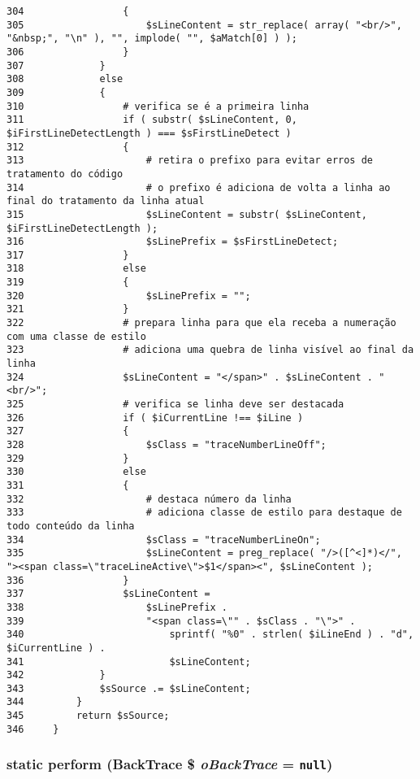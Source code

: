 \begin{Code}
\begin{verbatim}
304                 {
305                     $sLineContent = str_replace( array( "<br/>", "&nbsp;", "\n" ), "", implode( "", $aMatch[0] ) );
306                 }
307             }
308             else
309             {
310                 # verifica se é a primeira linha
311                 if ( substr( $sLineContent, 0, $iFirstLineDetectLength ) === $sFirstLineDetect )
312                 {
313                     # retira o prefixo para evitar erros de tratamento do código
314                     # o prefixo é adiciona de volta a linha ao final do tratamento da linha atual
315                     $sLineContent = substr( $sLineContent, $iFirstLineDetectLength );
316                     $sLinePrefix = $sFirstLineDetect;
317                 }
318                 else
319                 {
320                     $sLinePrefix = "";
321                 }
322                 # prepara linha para que ela receba a numeração com uma classe de estilo
323                 # adiciona uma quebra de linha visível ao final da linha
324                 $sLineContent = "</span>" . $sLineContent . "<br/>";
325                 # verifica se linha deve ser destacada
326                 if ( $iCurrentLine !== $iLine )
327                 {
328                     $sClass = "traceNumberLineOff";
329                 }
330                 else
331                 {
332                     # destaca número da linha
333                     # adiciona classe de estilo para destaque de todo conteúdo da linha
334                     $sClass = "traceNumberLineOn";
335                     $sLineContent = preg_replace( "/>([^<]*)</", "><span class=\"traceLineActive\">$1</span><", $sLineContent );
336                 }
337                 $sLineContent =
338                     $sLinePrefix .
339                     "<span class=\"" . $sClass . "\">" .
340                         sprintf( "%0" . strlen( $iLineEnd ) . "d", $iCurrentLine ) .
341                         $sLineContent;
342             }
343             $sSource .= $sLineContent;
344         }
345         return $sSource;
346     }
\end{verbatim}
\end{Code}


\hypertarget{class_back_trace_explain_4e3e5944ef133f107e9ebc98f1abde0a}{
\subsubsection[{perform}]{\setlength{\rightskip}{0pt plus 5cm}static perform ({\bf BackTrace} \$ {\em oBackTrace} = {\tt null})}}
\label{class_back_trace_explain_4e3e5944ef133f107e9ebc98f1abde0a}


